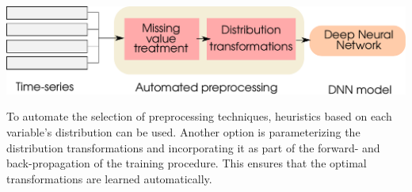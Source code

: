 \documentclass[portrait,final,x11names,a1paper,fontscale=0.4]{baposter}
\newcommand{\mvec}[1]{\mathbf{#1}}
\begin{document}
\begin{poster}
{\noindent
\includegraphics[width=\textwidth]{Figures/automated-preprocessing-diagram.pdf} 

\noindent
To automate the selection of preprocessing techniques, heuristics based on each
variable's distribution can be used. Another option is parameterizing the distribution
transformations and incorporating it as part of the forward- and back-propagation of the
training procedure. This ensures that the optimal transformations are learned automatically.


%
%
}


\end{poster}
\end{document}
